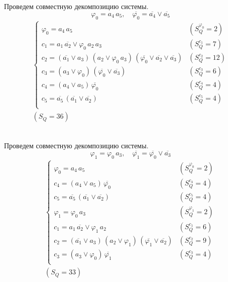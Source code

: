 \documentclass{article}
\begin{document}
\noindent\begin{minipage}{\textwidth}
Проведем совместную декомпозицию системы. \[\varphi_{0} = a_4\,a_5, \quad \overline{\varphi_{0}} = \overline{a_4} \lor \overline{a_5}\]
\[\begin{matrix}
    \begin{cases}
        \varphi_{0} = a_4\,a_5 & (S_Q^{\varphi_{0}} = 2) \\
        c_1 = a_1\,\overline{a_2} \lor \varphi_{0}\,a_2\,a_3 & (S_Q^{c_1} = 7) \\
        c_2 = \left(\overline{a_1} \lor a_3\right)\,\left(a_2 \lor \varphi_{0}\,a_3\right)\,\left(\overline{\varphi_{0}} \lor \overline{a_2} \lor \overline{a_3}\right) & (S_Q^{c_2} = 12) \\
        c_3 = \left(a_3 \lor \varphi_{0}\right)\,\left(\overline{\varphi_{0}} \lor \overline{a_3}\right) & (S_Q^{c_3} = 6) \\
        c_4 = \left(a_4 \lor a_5\right)\,\overline{\varphi_{0}} & (S_Q^{c_4} = 4) \\
        c_5 = \overline{a_5}\,\left(\overline{a_1} \lor \overline{a_2}\right) & (S_Q^{c_5} = 4) \\
    \end{cases} \\ (S_Q = 36)
\end{matrix}\] \\ \phantom{0}
\end{minipage}
\noindent\begin{minipage}{\textwidth}
Проведем совместную декомпозицию системы. \[\varphi_{1} = \varphi_{0}\,a_3, \quad \overline{\varphi_{1}} = \overline{\varphi_{0}} \lor \overline{a_3}\]
\[\begin{matrix}
    \begin{cases}
        \varphi_{0} = a_4\,a_5 & (S_Q^{\varphi_{0}} = 2) \\
        c_4 = \left(a_4 \lor a_5\right)\,\overline{\varphi_{0}} & (S_Q^{c_4} = 4) \\
        c_5 = \overline{a_5}\,\left(\overline{a_1} \lor \overline{a_2}\right) & (S_Q^{c_5} = 4) \\
        \varphi_{1} = \varphi_{0}\,a_3 & (S_Q^{\varphi_{1}} = 2) \\
        c_1 = a_1\,\overline{a_2} \lor \varphi_{1}\,a_2 & (S_Q^{c_1} = 6) \\
        c_2 = \left(\overline{a_1} \lor a_3\right)\,\left(a_2 \lor \varphi_{1}\right)\,\left(\overline{\varphi_{1}} \lor \overline{a_2}\right) & (S_Q^{c_2} = 9) \\
        c_3 = \left(a_3 \lor \varphi_{0}\right)\,\overline{\varphi_{1}} & (S_Q^{c_3} = 4) \\
    \end{cases} \\ (S_Q = 33)
\end{matrix}\] \\ \phantom{0}
\end{minipage}
\end{document}
